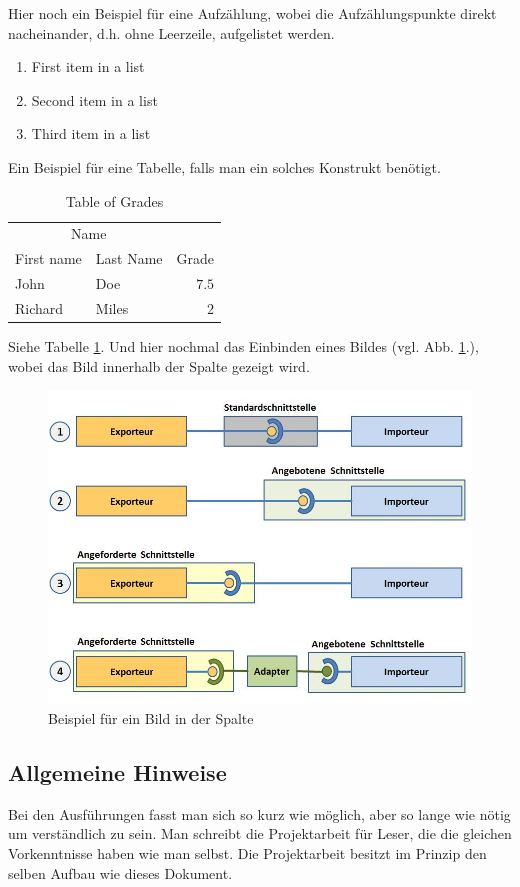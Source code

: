 \documentclass[fleqn,10pt,ngerman]{SelfArx}
\begin{document}
Hier noch ein Beispiel für eine Aufzählung, wobei die Aufzählungspunkte direkt nacheinander, d.h. ohne Leerzeile, aufgelistet werden.
\begin{enumerate}[noitemsep] %
	\item First item in a list
	\item Second item in a list
	\item Third item in a list
\end{enumerate}

Ein Beispiel für eine Tabelle, falls man ein solches Konstrukt benötigt.

\begin{table}[hbt]
	\caption{Table of Grades}
	\centering
	\begin{tabular}{llr}
		\toprule
		\multicolumn{2}{c}{Name} \\
		\cmidrule(r){1-2}
		First name & Last Name & Grade \\
		\midrule
		John & Doe & $7.5$ \\
		Richard & Miles & $2$ \\
		\bottomrule
	\end{tabular}
	\label{tab:label}
\end{table}

Siehe Tabelle \ref{tab:label}.
Und hier nochmal das Einbinden eines Bildes (vgl. Abb. \ref{fig:Schnittstellen}.), wobei das Bild innerhalb der Spalte gezeigt wird.


\begin{figure}[ht]\centering
	\includegraphics[width=5 cm]{Abbildungen/Schnittstellen}
	\caption{Beispiel für ein Bild in der Spalte}
	\label{fig:Schnittstellen}
\end{figure}

\subsection{Allgemeine Hinweise}
Bei den Ausführungen fasst man sich so kurz wie möglich, aber so lange wie nötig um verständlich zu sein. Man schreibt die Projektarbeit für Leser, die die gleichen Vorkenntnisse haben wie man selbst.
Die Projektarbeit besitzt im Prinzip den selben Aufbau wie dieses Dokument.
\end{document}

